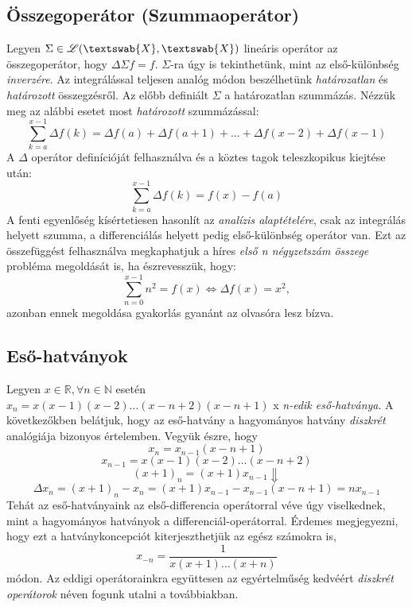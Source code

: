 \documentclass[14p]{article}
\begin{document}
\subsection{Összegoperátor (Szummaoperátor)}
Legyen $\Sigma \in \mathscr{L}(\textswab{X}, \textswab{X})$ lineáris operátor az összegoperátor, hogy $\Delta\Sigma f = f$. $\Sigma$-ra úgy is tekinthetünk, mint az első-különbség \emph{inverzére}. Az integrálással teljesen analóg módon beszélhetünk \emph{határozatlan} és \emph{határozott} összegzésről. Az előbb definiált $\Sigma$ a határozatlan szummázás. Nézzük meg az alábbi esetet most \emph{határozott} szummázással:
\[
	\sum_{k=a}^{x-1}\Delta f(k) = \Delta f(a) + \Delta f(a+1) + \dots + \Delta f(x-2) + \Delta f(x-1)
\]
A $\Delta$ operátor definícióját felhasználva és a köztes tagok teleszkopikus kiejtése után:
\[
	\sum_{k=a}^{x-1}\Delta f(k) = f(x) - f(a)
\]
A fenti egyenlőség kísértetiesen hasonlít az \emph{analízis alaptételére}, csak az integrálás helyett szumma, a differenciálás helyett pedig első-különbség operátor van. Ezt az összefüggést felhasználva megkaphatjuk a híres \emph{első n négyzetszám összege} probléma megoldását is, ha észrevesszük, hogy:
\[
	\sum_{n=0}^{x-1} n^2 = f(x) \Longleftrightarrow \Delta f(x) = x^2,
\]
azonban ennek megoldása gyakorlás gyanánt az olvasóra lesz bízva.
\subsection{Eső-hatványok}
Legyen $x \in \mathbb{R}, \forall n \in \mathbb{N}$ esetén $x_n = x(x-1)(x-2)\dots (x-n+2)(x-n+1)$ x \emph{n-edik eső-hatványa}. A következőkben belátjuk, hogy az eső-hatvány a hagyományos hatvány \emph{diszkrét} analógiája bizonyos értelemben.
Vegyük észre, hogy
\[
	x_n = x_{n-1}(x-n+1)
\]
\[
	x_{n-1} = x(x-1)(x-2)\dots (x-n+2)
\]
\[
	(x+1)_n = (x+1)x_{n-1}
	\Downarrow
\]
\[
	\Delta x_n = (x+1)_n - x_n = (x+1)x_{n-1} - x_{n-1}(x-n+1) = nx_{n-1}
\]
Tehát az eső-hatványaink az első-differencia operátorral véve úgy viselkednek, mint a hagyományos hatványok a differenciál-operátorral. Érdemes megjegyezni, hogy ezt a hatványkoncepciót kiterjeszthetjük az egész számokra is,
\[
	x_{-n} = \frac{1}{x(x+1)\dots (x+n)}
\]
módon. Az eddigi operátorainkra együttesen az egyértelműség kedvéért \emph{diszkrét operátorok} néven fogunk utalni a továbbiakban.
\end{document}
